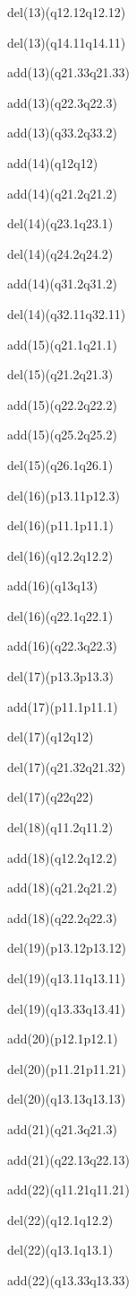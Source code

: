 \documentclass[]{article}
\begin{document}
del(13)(q12.12q12.12)

del(13)(q14.11q14.11)

add(13)(q21.33q21.33)

add(13)(q22.3q22.3)

add(13)(q33.2q33.2)

add(14)(q12q12)

add(14)(q21.2q21.2)

del(14)(q23.1q23.1)

del(14)(q24.2q24.2)

add(14)(q31.2q31.2)

del(14)(q32.11q32.11)

add(15)(q21.1q21.1)

del(15)(q21.2q21.3)

add(15)(q22.2q22.2)

add(15)(q25.2q25.2)

del(15)(q26.1q26.1)

del(16)(p13.11p12.3)

del(16)(p11.1p11.1)

del(16)(q12.2q12.2)

add(16)(q13q13)

del(16)(q22.1q22.1)

add(16)(q22.3q22.3)

del(17)(p13.3p13.3)

add(17)(p11.1p11.1)

del(17)(q12q12)

del(17)(q21.32q21.32)

del(17)(q22q22)

del(18)(q11.2q11.2)

add(18)(q12.2q12.2)

add(18)(q21.2q21.2)

add(18)(q22.2q22.3)

del(19)(p13.12p13.12)

del(19)(q13.11q13.11)

del(19)(q13.33q13.41)

add(20)(p12.1p12.1)

del(20)(p11.21p11.21)

del(20)(q13.13q13.13)

add(21)(q21.3q21.3)

add(21)(q22.13q22.13)

add(22)(q11.21q11.21)

del(22)(q12.1q12.2)

del(22)(q13.1q13.1)

add(22)(q13.33q13.33)
\end{document}
